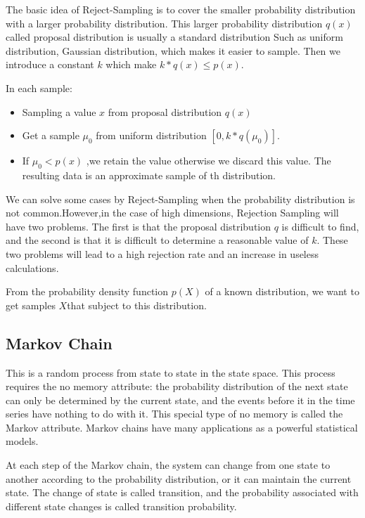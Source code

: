 The basic idea of Reject-Sampling \cite{samp} is to cover the smaller probability distribution with a larger probability distribution. This larger probability distribution $q(x)$ called proposal distribution  is usually a standard distribution Such as uniform distribution, Gaussian distribution, which makes it easier to sample. Then we introduce a constant $k$ which make $k*q(x) \leq p(x)$.

 In each sample:

\begin{itemize}
  \item Sampling a value $x$ from proposal distribution $q(x)$
  \item Get a sample $\mu_0$ from uniform distribution $[0,k*q(\mu_0)]$.
  \item If $\mu_0 < p(x)$ ,we retain the value otherwise we discard this value. The resulting data is an approximate sample of th distribution.
\end{itemize}

We can solve some cases  by Reject-Sampling when the probability distribution is not common.However,in the case of high dimensions, Rejection Sampling will have two problems. The first is that the proposal  distribution $q$ is difficult to find, and the second is that it is difficult to determine a reasonable value of $k$. These two problems will lead to a high rejection rate and an increase in useless calculations.


From the probability density function $p(X)$ of a known distribution, we want to get  samples $X$that subject to this distribution.


\subsection{Markov Chain}
This is a random process from state to state in the state space. This process requires the no memory attribute: the probability distribution of the next state can only be determined by the current state, and the events before it in the time series have nothing to do with it. This special type of no memory is called the Markov attribute. Markov chains have many applications as a powerful statistical models.

At each step of the Markov chain, the system can change from one state to another according to the probability distribution, or it can maintain the current state. The change of state is called transition, and the probability associated with different state changes is called transition probability.

